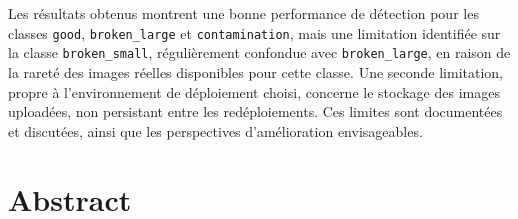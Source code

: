 \documentclass[11pt,a4paper]{report}
\begin{document}
Les r\'esultats obtenus montrent une bonne performance de d\'etection pour les classes \texttt{good}, \texttt{broken\_large} et \texttt{contamination}, mais une limitation identifi\'ee sur la classe \texttt{broken\_small}, r\'eguli\`erement confondue avec \texttt{broken\_large}, en raison de la raret\'e des images r\'eelles disponibles pour cette classe. Une seconde limitation, propre \`a l'environnement de d\'eploiement choisi, concerne le stockage des images upload\'ees, non persistant entre les red\'eploiements. Ces limites sont document\'ees et discut\'ees, ainsi que les perspectives d'am\'elioration envisageables.

\chapter*{Abstract}
\end{document}
